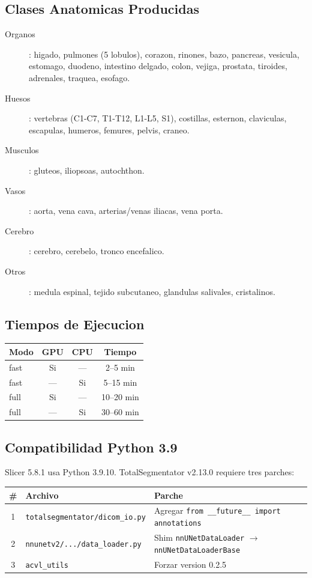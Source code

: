 \documentclass[12pt,a4paper]{article}
\begin{document}
\subsection{Clases Anatomicas Producidas}

\begin{description}
    \item[Organos]: higado, pulmones (5 lobulos), corazon, rinones, bazo, pancreas,
          vesicula, estomago, duodeno, intestino delgado, colon, vejiga, prostata,
          tiroides, adrenales, traquea, esofago.
    \item[Huesos]: vertebras (C1-C7, T1-T12, L1-L5, S1), costillas, esternon,
          claviculas, escapulas, humeros, femures, pelvis, craneo.
    \item[Musculos]: gluteos, iliopsoas, autochthon.
    \item[Vasos]: aorta, vena cava, arterias/venas iliacas, vena porta.
    \item[Cerebro]: cerebro, cerebelo, tronco encefalico.
    \item[Otros]: medula espinal, tejido subcutaneo, glandulas salivales, cristalinos.
\end{description}

\subsection{Tiempos de Ejecucion}

\begin{table}[H]
\centering
\begin{tabular}{l c c c}
\toprule
\textbf{Modo} & \textbf{GPU} & \textbf{CPU} & \textbf{Tiempo} \\
\midrule
fast & Si & --- & 2--5 min \\
fast & --- & Si & 5--15 min \\
full & Si & --- & 10--20 min \\
full & --- & Si & 30--60 min \\
\bottomrule
\end{tabular}
\end{table}

\subsection{Compatibilidad Python 3.9}

Slicer 5.8.1 usa Python 3.9.10. TotalSegmentator v2.13.0 requiere tres parches:

\begin{table}[H]
\centering
\begin{tabular}{c l l}
\toprule
\textbf{\#} & \textbf{Archivo} & \textbf{Parche} \\
\midrule
1 & \texttt{totalsegmentator/dicom\_io.py} & Agregar \texttt{from \_\_future\_\_ import annotations} \\
2 & \texttt{nnunetv2/.../data\_loader.py} & Shim \texttt{nnUNetDataLoader} $\to$ \texttt{nnUNetDataLoaderBase} \\
3 & \texttt{acvl\_utils} & Forzar version 0.2.5 \\
\bottomrule
\end{tabular}
\end{table}
\end{document}
